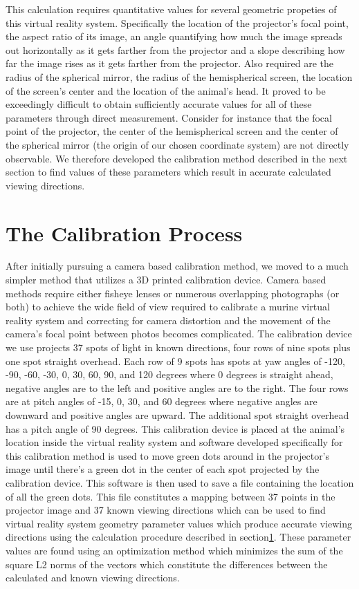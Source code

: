 \documentclass{article}
\begin{document}
This calculation requires quantitative values for several geometric propeties
of this virtual reality system. Specifically the location of the projector's
focal point, the aspect ratio of its image, an angle quantifying how much the
image spreads out horizontally as it gets farther from the projector and a
slope describing how far the image rises as it gets farther from the projector.
Also required are the radius of the spherical mirror, the radius of the
hemispherical screen, the location of the screen's center and the location of
the animal's head. It proved to be exceedingly difficult to obtain sufficiently
accurate values for all of these parameters through direct measurement.
Consider for instance that the focal point of the projector, the center of the
hemispherical screen and the center of the spherical mirror (the origin of our
chosen coordinate system) are not directly observable. We therefore developed
the calibration method described in the next section to find values of these
parameters which result in accurate calculated viewing directions.


\section{The Calibration Process}

After initially pursuing a camera based calibration method, we moved to a much
simpler method that utilizes a 3D printed calibration device. Camera based
methods require either fisheye lenses or numerous overlapping photographs (or
both) to achieve the wide field of view required to calibrate a murine virtual
reality system and correcting for camera distortion and the movement of the
camera's focal point between photos becomes complicated.  The calibration
device we use projects 37 spots of light in known directions, four rows of nine
spots plus one spot straight overhead. Each row of 9 spots has spots at yaw
angles of -120, -90, -60, -30, 0, 30, 60, 90, and 120 degrees where 0 degrees
is straight ahead, negative angles are to the left and positive angles are to
the right.  The four rows are at pitch angles of -15, 0, 30, and 60 degrees
where negative angles are downward and positive angles are upward. The
additional spot straight overhead has a pitch angle of 90 degrees. This
calibration device is placed at the animal's location inside the virtual
reality system and software developed specifically for this calibration method
is used to move green dots around in the projector's image until there's a
green dot in the center of each spot projected by the calibration device. This
software is then used to save a file containing the location of all the green
dots. This file constitutes a mapping between 37 points in the projector image
and 37 known viewing directions which can be used to find virtual reality
system geometry parameter values which produce accurate viewing directions
using the calculation procedure described in section\ref{}.  These parameter
values are found using an optimization method which minimizes the sum of the
square L2 norms of the vectors which constitute the differences between the
calculated and known viewing directions.
\end{document}
